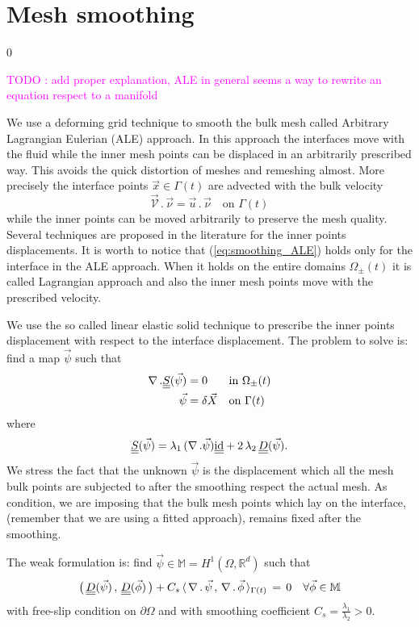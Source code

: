 \documentclass[a4paper,12pt,onecolumn]{article}
\newcommand{\R}{{\mathbb R}}
\newcommand{\id}{\rm id}
\newcommand{\mat}[1]{\underline{\underline{#1}}\rule{0pt}{0pt}}
\begin{document}
\section{Mesh smoothing} \label{sec:smoothing}
\setcounter{equation} 0

\textcolor{magenta}{TODO : add proper explanation, ALE in general seems a way to rewrite an equation respect to a manifold}

We use a deforming grid technique to smooth the bulk mesh called Arbitrary Lagrangian Eulerian (ALE) approach. In this approach the interfaces move with the fluid while the inner mesh points can be displaced in an arbitrarily prescribed way. This avoids the quick distortion of meshes and remeshing almost. More precisely the interface points $\vec x \in \Gamma(t)$ are advected with the bulk velocity
\begin{equation}\label{eq:smoothing_ALE}
\vec{\mathcal{V}}\,.\,\vec\nu = \vec u\,.\,\vec \nu\quad \mbox{on }\Gamma(t)
\end{equation}
while the inner points can be moved arbitrarily to preserve the mesh quality. Several techniques are proposed in the literature for the inner points displacements. It is worth to notice that (\ref{eq:smoothing_ALE}) holds only for the interface in the ALE approach. When it holds on the entire domains $\Omega_{\pm}(t)$ it is called Lagrangian approach and also the inner mesh points move with the prescribed velocity.

We use the so called linear elastic solid technique to prescribe the inner points displacement with respect to the interface displacement. The problem to solve is: find a map $\vec \psi$ such that
\begin{align}
 \nabla\,.\mat S(\vec \psi) &= 0 && \mbox{in }\Omega_{\pm}(t)\\
 \vec \psi &= \delta \vec X && \mbox{on } \Gamma(t) 
\end{align}
where
\begin{equation} \label{eq:elasticity_tensor}
\mat S(\vec \psi) = \lambda_1 \,(\nabla\,.\vec\psi)\mat\id + 2\,\lambda_2\, \mat D(\vec\psi).
\end{equation}
We stress the fact that the unknown $\vec\psi$ is the displacement which all the mesh bulk points are subjected to after the smoothing respect the actual mesh. As condition, we are imposing that the bulk mesh points which lay on the interface, (remember that we are using a fitted approach), remains fixed after the smoothing.

The weak formulation is: find $\vec\psi\in \mathbb{M}= H^1(\Omega, \R^d)$ such that
\begin{equation}
 \big(\,\mat D(\vec\psi)\,,\,\mat D (\vec \phi)\,\big)+
 C_s\,\langle\, \nabla\,.\,\vec \psi\,,\,\nabla\,.\,\vec\phi\,\rangle_{\Gamma(t)}\, 
 =\, 0\quad \forall \vec \phi \in\mathbb{M}
\end{equation}
with free-slip condition on $\partial\Omega$ and with smoothing coefficient $C_s=\frac{\lambda_1}{\lambda_2}>0$.
\end{document}
